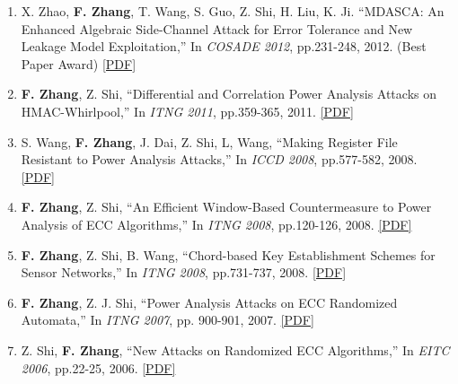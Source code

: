 \documentclass[11pt]{article}
\begin{document}
\begin{enumerate}
\item X. Zhao, {\bf F. Zhang}, T. Wang, S. Guo, Z. Shi, H. Liu, K. Ji. ``MDASCA: An Enhanced Algebraic Side-Channel Attack for Error Tolerance and New Leakage Model Exploitation,'' In {\it COSADE 2012}, pp.231-248, 2012. ({\color{red}Best Paper Award}) \href{http://www.isee.zju.edu.cn/fanzhang/publications/2012\_cosade\_MDASCA.pdf}{[PDF]}
\item {\bf F. Zhang}, Z. Shi, ``Differential and Correlation Power Analysis Attacks on HMAC-Whirlpool,'' In {\it ITNG 2011}, pp.359-365, 2011. \href{http://www.isee.zju.edu.cn/fanzhang/publications/2011\_itng\_whirlpool.pdf}{[PDF]}
\item S. Wang, {\bf F. Zhang}, J. Dai, Z. Shi, L, Wang, ``Making Register File Resistant to Power Analysis Attacks,'' In {\it ICCD 2008}, pp.577-582, 2008. \href{http://www.isee.zju.edu.cn/fanzhang/publications/2008\_iccd\_rfrf.pdf}{[PDF]}
\item {\bf F. Zhang}, Z. Shi, ``An Efficient Window-Based Countermeasure to Power Analysis of ECC Algorithms,'' In {\it ITNG 2008}, pp.120-126, 2008. \href{http://www.isee.zju.edu.cn/fanzhang/publications/2008\_itng\_window.pdf}{[PDF]}
\item {\bf F. Zhang}, Z. Shi, B. Wang, ``Chord-based Key Establishment Schemes for Sensor Networks,'' In {\it ITNG 2008}, pp.731-737, 2008. \href{http://www.isee.zju.edu.cn/fanzhang/publications/2008\_itng\_CBKE.pdf}{[PDF]}
\item {\bf F. Zhang}, Z. J. Shi, ``Power Analysis Attacks on ECC Randomized Automata,'' In {\it ITNG 2007}, pp. 900-901, 2007. \href{http://www.isee.zju.edu.cn/fanzhang/publications/2007\_itng\_ecc\_poster.pdf}{[PDF]}
\item Z. Shi, {\bf F. Zhang}, ``New Attacks on Randomized ECC Algorithms,'' In {\it EITC 2006}, pp.22-25, 2006. \href{http://www.isee.zju.edu.cn/fanzhang/publications/2006\_eitc\_ecc.pdf}{[PDF]}
\end{enumerate}
\end{document}
